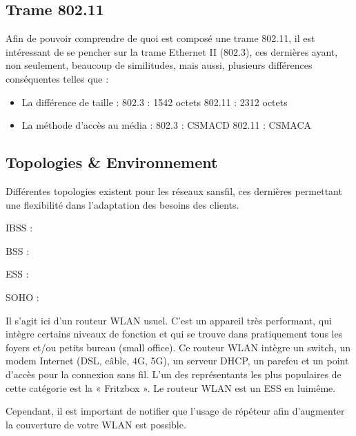 \documentclass[letterpaper,10pt,french]{sphinxmanual}
\begin{document}
\subsection{Trame 802.11}
\label{\detokenize{Documentation-M144:trame-802-11}}
\sphinxAtStartPar
Afin de pouvoir comprendre de quoi est composé une trame 802.11, il est intéressant de se pencher sur la trame Ethernet II (802.3), ces dernières ayant, non seulement, beaucoup de similitudes, mais aussi, plusieurs différences conséquentes telles que :
\begin{itemize}
\item {} 
\sphinxAtStartPar
La différence de taille :
\sphinxhyphen{} 802.3 : 1542 octets
\sphinxhyphen{} 802.11 : 2312 octets

\item {} 
\sphinxAtStartPar
La méthode d’accès au média :
\sphinxhyphen{} 802.3 : CSMA\sphinxhyphen{}CD
\sphinxhyphen{} 802.11 : CSMA\sphinxhyphen{}CA

\end{itemize}


\subsection{Topologies \& Environnement}
\label{\detokenize{Documentation-M144:topologies-environnement}}
\sphinxAtStartPar
Différentes topologies existent pour les réseaux sans\sphinxhyphen{}fil, ces dernières permettant une flexibilité dans l’adaptation des besoins des clients.

\sphinxAtStartPar
IBSS :

\sphinxAtStartPar
BSS :

\sphinxAtStartPar
ESS :

\sphinxAtStartPar
SOHO :

\sphinxAtStartPar
Il s’agit ici d’un routeur W\sphinxhyphen{}LAN usuel. C’est un appareil très performant, qui intègre certains niveaux de fonction et qui se trouve dans pratiquement tous les foyers et/ou petits bureau (small office). Ce routeur W\sphinxhyphen{}LAN intègre un switch, un modem Internet (DSL, câble, 4G, 5G), un serveur DHCP, un pare\sphinxhyphen{}feu et un point d’accès pour la connexion sans fil. L’un des représentants les plus populaires de cette catégorie est la « Fritzbox ». Le routeur W\sphinxhyphen{}LAN est un ESS en lui\sphinxhyphen{}même.

\sphinxAtStartPar
Cependant, il est important de notifier que l’usage de répéteur afin d’augmenter la couverture de votre W\sphinxhyphen{}LAN est possible.
\end{document}
